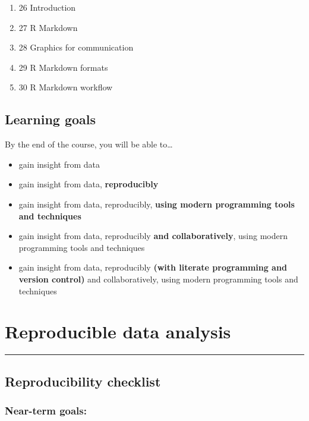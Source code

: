 \documentclass[
]{book}
\providecommand{\tightlist}{%
  \setlength{\itemsep}{0pt}\setlength{\parskip}{0pt}}
\theoremstyle{definition}
\theoremstyle{definition}
\theoremstyle{definition}
\theoremstyle{definition}
\theoremstyle{remark}
\begin{document}
\begin{enumerate}
\def\labelenumi{\alph{enumi})}
\tightlist
\item
  26 Introduction
\item
  27 R Markdown
\item
  28 Graphics for communication
\item
  29 R Markdown formats
\item
  30 R Markdown workflow
\end{enumerate}

\hypertarget{learning-goals-1}{%
\section{Learning goals}\label{learning-goals-1}}

By the end of the course, you will be able to\ldots{}

\begin{itemize}
\tightlist
\item
  gain insight from data
\item
  gain insight from data, \textbf{reproducibly}
\item
  gain insight from data, reproducibly, \textbf{using modern programming tools and techniques}
\item
  gain insight from data, reproducibly \textbf{and collaboratively}, using modern programming tools and techniques
\item
  gain insight from data, reproducibly \textbf{(with literate programming and version control)} and collaboratively, using modern programming tools and techniques
\end{itemize}

\hypertarget{reproducible-data-analysis}{%
\chapter{Reproducible data analysis}\label{reproducible-data-analysis}}

\begin{center}\rule{0.5\linewidth}{0.5pt}\end{center}

\hypertarget{reproducibility-checklist}{%
\section{Reproducibility checklist}\label{reproducibility-checklist}}

\hypertarget{near-term-goals}{%
\subsection{Near-term goals:}\label{near-term-goals}}
\end{document}
